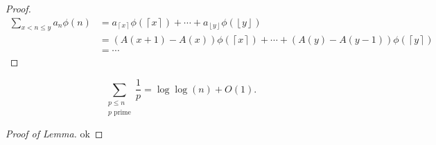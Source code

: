 \documentclass[12pt]{amsart}
\begin{document}
\begin{proof}
\begin{align*}
    \sum _{x < n \leq y} a_{n} \phi(n) & = a_{\left\lceil x \right\rceil } \phi(\left\lceil x \right\rceil ) + \cdots  + a_{\left\lfloor y \right\rfloor } \phi(\left\lfloor y \right\rfloor )\\
    & = \left( A(x + 1) - A(x) \right) \phi(\left\lceil x \right\rceil ) + \cdots + \left( A(y) - A(y-1) \right) \phi(\left\lceil y \right\rceil ) \\
    & = \cdots 
\end{align*}
\end{proof}






\begin{lemma*}
\[
    \sum _{\substack{ p \leq n \\ p\text{ prime}  }} \frac{1}{p}  = \log\log \left( n \right) + O(1)
.\]
\end{lemma*}

\begin{proof}[Proof of Lemma]
ok
\end{proof}
\end{document}
